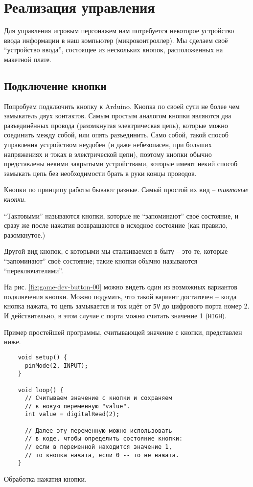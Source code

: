 \documentclass[../sparc.tex]{subfiles}
\begin{document}
\section{Реализация управления}

Для управления игровым персонажем нам потребуется некоторое устройство ввода
информации в наш компьютер (микроконтроллер).  Мы сделаем своё ``устройство
ввода'', состоящее из нескольких кнопок, расположенных на макетной плате.

\subsection{Подключение кнопки}

Попробуем подключить кнопку к Arduino.  Кнопка по своей сути не более чем
замыкатель двух контактов.  Самым простым аналогом кнопки являются два
разъединённых провода (разомкнутая электрическая цепь), которые можно соединить
между собой, или опять разъединить.  Само собой, такой способ управления
устройством неудобен (и даже небезопасен, при больших напряжениях и токах в
электрической цепи), поэтому кнопки обычно представлены некими закрытыми
устройствами, которые имеют некий способ замыкать цепь без необходимости брать в
руки концы проводов.

Кнопки по принципу работы бывают разные.  Самый простой их вид -- \emph{тактовые
кнопки}.

``Тактовыми'' называются кнопки, которые не ``запоминают'' своё состояние, и
сразу же после нажатия возвращаются в исходное состояние (как правило,
разомкнутое.)

Другой вид кнопок, с которыми мы сталкиваемся в быту -- это те, которые
``запоминают'' своё состояние; такие кнопки обычно называются
``переключателями''.

На рис. \ref{fig:game-dev-button-00} можно видеть один из возможных вариантов
подключения кнопки.  Можно подумать, что такой вариант достаточен -- когда кнопка
нажата, то цепь замыкается и ток идёт от \texttt{5V} до цифрового порта номер 2.
И действительно, в этом случае с порта можно считать значение 1 (\texttt{HIGH}).


Пример простейшей программы, считывающей значение с кнопки, представлен ниже.

\begin{listing}[H]
  \begin{verbatim}
    void setup() {
      pinMode(2, INPUT);
    }

    void loop() {
      // Считываем значение с кнопки и сохраняем
      // в новую переменную "value".
      int value = digitalRead(2);

      // Далее эту переменную можно использовать
      // в коде, чтобы определить состояние кнопки:
      // если в переменной находится значение 1,
      // то кнопка нажата, если 0 -- то не нажата.
    }
  \end{verbatim}
  \caption{Обработка нажатия кнопки.}
  \label{listing:button-00}
\end{listing}
\end{document}
